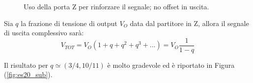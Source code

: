 \documentclass[10pt,letterpaper]{article}
\begin{document}
\begin{figure}
\centering
{}
{}

\caption{Uso della porta Z per rinforzare il segnale; no offset in uscita.}
\label{fig:es21}
\end{figure}

Sia $q$ la frazione di tensione di output $V_O$ data dal partitore in Z, allora il segnale di uscita complessivo sarà:\\

\begin{equation}
V_{TOT} = V_O (1 + q + q^2 + q^3 + ...) = V_O \frac{1}{1-q}
\end{equation}


Il risultato per $q \simeq \left(3/4 , 10/11 \right) $ è molto gradevole ed è riportato in Figura (\ref{fig:es20_sub}).\\
\end{document}
